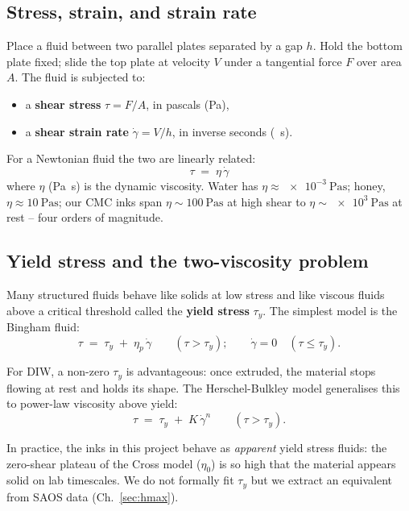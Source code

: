 \documentclass[11pt,a4paper]{article}
\newcommand{\gd}{\dot{\gamma}}
\begin{document}
\subsection{Stress, strain, and strain rate}

Place a fluid between two parallel plates separated by a gap $h$. Hold
the bottom plate fixed; slide the top plate at velocity $V$ under a
tangential force $F$ over area $A$. The fluid is subjected to:

\begin{itemize}[leftmargin=1.6em,itemsep=2pt]
\item a \textbf{shear stress} $\tau = F/A$, in pascals (\si{\Pa}),
\item a \textbf{shear strain rate} $\gd = V/h$, in inverse seconds
(\si{\per\s}).
\end{itemize}

For a Newtonian fluid the two are linearly related:
\begin{equation}
\tau \;=\; \eta\,\gd
\label{eq:newton}
\end{equation}
where $\eta$ (\si{\Pa\s}) is the dynamic viscosity. Water has
$\eta\approx \SI{e-3}{\Pa\s}$; honey, $\eta\approx \SI{10}{\Pa\s}$;
our CMC inks span $\eta\sim\SI{100}{\Pa\s}$ at high shear to
$\eta\sim\SI{e3}{\Pa\s}$ at rest -- four orders of magnitude.

\subsection{Yield stress and the two-viscosity problem}

Many structured fluids behave like solids at low stress and like
viscous fluids above a critical threshold called the \textbf{yield
stress} $\tau_y$. The simplest model is the Bingham fluid:
\begin{equation}
\tau \;=\; \tau_y \;+\; \eta_p\,\gd \qquad (\tau > \tau_y);
\qquad \gd = 0 \quad (\tau \leq \tau_y).
\label{eq:bingham}
\end{equation}

For DIW, a non-zero $\tau_y$ is advantageous: once extruded, the
material stops flowing at rest and holds its shape. The Herschel-Bulkley
model generalises this to power-law viscosity above yield:
\begin{equation}
\tau \;=\; \tau_y \;+\; K\,\gd^n \qquad (\tau > \tau_y).
\label{eq:HB}
\end{equation}

In practice, the inks in this project behave as \emph{apparent} yield
stress fluids: the zero-shear plateau of the Cross model ($\eta_0$) is
so high that the material appears solid on lab timescales. We do not
formally fit $\tau_y$ but we extract an equivalent from SAOS data
(Ch.~\ref{sec:hmax}).
\end{document}
